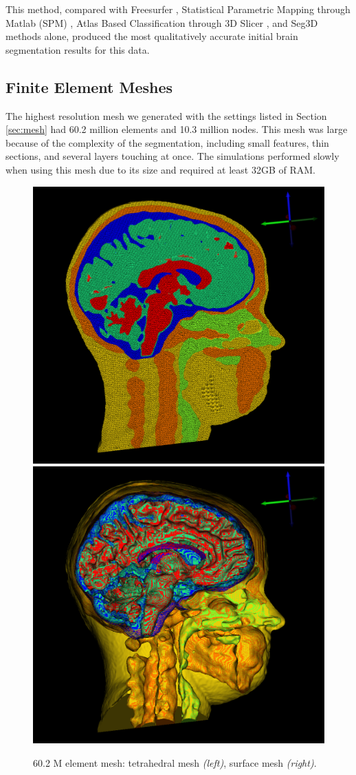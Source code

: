 This method, compared with Freesurfer \cite{ref:freesurf}, Statistical Parametric Mapping through Matlab (SPM) \cite{ref:spm}, Atlas Based Classification through 3D Slicer \cite{ref:abc}, and Seg3D methods alone, produced the most qualitatively accurate initial brain segmentation results for this data.

\subsection{Finite Element Meshes}

The highest resolution mesh we generated with the settings listed in Section \ref{sec:mesh} had 60.2 million elements and 10.3 million nodes. This mesh was large because of the complexity of the segmentation, including small features, thin sections, and several layers touching at once. The simulations performed slowly when using this mesh due to its size and required at least 32GB of RAM.

\begin{figure}[H]
\begin{center}
\includegraphics[width=.49\textwidth]{Figures/bigmesh_1}
\includegraphics[width=.49\textwidth]{Figures/bigmesh_surface}
\caption{60.2 M element mesh: tetrahedral mesh \textit{(left)}, surface mesh \textit{(right)}.}
\label{fig:bigmesh}
\end{center}
\end{figure}

